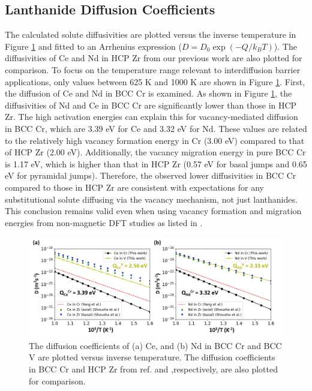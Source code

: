 \documentclass[preprint,12pt]{elsarticle}
\begin{document}
\FloatBarrier
\subsection{Lanthanide Diffusion Coefficients}
The calculated solute diffusivities are plotted versus the inverse temperature in Figure \ref{fig:diff_cr_v} and fitted to an Arrhenius expression ($D = D_0 \exp(-Q/k_BT)$). The diffusivities of Ce and Nd in HCP Zr from our previous work \cite{shousha2024first} are also plotted for comparison. To focus on the temperature range relevant to interdiffusion barrier applications, only values between 625 K and 1000 K are shown in Figure \ref{fig:diff_cr_v}.
First, the diffusion of Ce and Nd in BCC Cr is examined. As shown in Figure \ref{fig:diff_cr_v}, the diffusivities of Nd and Ce in BCC Cr are significantly lower than those in HCP Zr. The high activation energies can explain this for vacancy-mediated diffusion in BCC Cr, which are 3.39 eV for Ce and 3.32 eV for Nd. These values are related to the relatively high vacancy formation energy in Cr (3.00 eV) compared to that of HCP Zr (2.00 eV). Additionally, the vacancy migration energy in pure BCC Cr is 1.17 eV, which is higher than that in HCP Zr (0.57 eV for basal jumps and 0.65 eV for pyramidal jumps). Therefore, the observed lower diffusivities in BCC Cr compared to those in HCP Zr are consistent with expectations for any substitutional solute diffusing via the vacancy mechanism, not just lanthanides. This conclusion remains valid even when using vacancy formation and migration energies from non-magnetic DFT studies \cite{nguyen_bcc_2006, yang_significant_2023, SHANG2016128} as listed in .

\begin{figure}[h!]
    \centering
    \includegraphics[width=0.9\linewidth]{diffusivities_cr_v_yang.jpg}
    \caption{The diffusion coefficients of (a) Ce, and (b) Nd in BCC Cr and BCC V are plotted versus inverse temperature. The diffusion coefficients in BCC Cr and HCP Zr from ref. \citep{yang_significant_2023} and \cite{shousha2024first},respectively, are also plotted for comparison.}
    \label{fig:diff_cr_v}
\end{figure}
\end{document}

